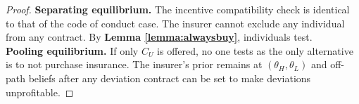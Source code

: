 \documentclass[natbib=false,preprint,12pt]{elsarticle}
\theoremstyle{plain}
\newtheorem{prop}[theorem]{Proposition}
\theoremstyle{definition}
\theoremstyle{plain}
\theoremstyle{TheoremNum}
\theoremstyle{CorollaryNum}
\theoremstyle{PropositionNum}
\theoremstyle{TheoremNum}
\begin{document}
\begin{proof}
    \textbf{Separating equilibrium.} The incentive compatibility check is identical to that of the code of conduct case. The insurer cannot exclude any individual from any contract. By \textbf{Lemma \ref{lemma:alwaysbuy}}, individuals test. \\
    \textbf{Pooling equilibrium.} If only $C_U$ is offered, no one tests as the only alternative is to not purchase insurance. The insurer's prior remains at $(\theta_H,\theta_L)$ and off-path beliefs after any deviation contract can be set to make deviations unprofitable.
\end{proof}


\end{document}
